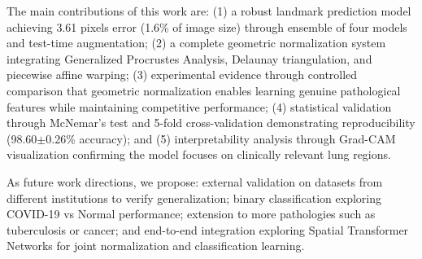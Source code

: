 \documentclass[applsci,article,submit,pdftex,moreauthors]{Definitions/mdpi}
\begin{document}
The main contributions of this work are: (1) a robust landmark prediction model achieving 3.61 pixels error (1.6\% of image size) through ensemble of four models and test-time augmentation; (2) a complete geometric normalization system integrating Generalized Procrustes Analysis, Delaunay triangulation, and piecewise affine warping; (3) experimental evidence through controlled comparison that geometric normalization enables learning genuine pathological features while maintaining competitive performance; (4) statistical validation through McNemar's test and 5-fold cross-validation demonstrating reproducibility (98.60$\pm$0.26\% accuracy); and (5) interpretability analysis through Grad-CAM visualization confirming the model focuses on clinically relevant lung regions.

As future work directions, we propose: external validation on datasets from different institutions to verify generalization; binary classification exploring COVID-19 vs Normal performance; extension to more pathologies such as tuberculosis or cancer; and end-to-end integration exploring Spatial Transformer Networks for joint normalization and classification learning.

\vspace{6pt}







\end{document}
